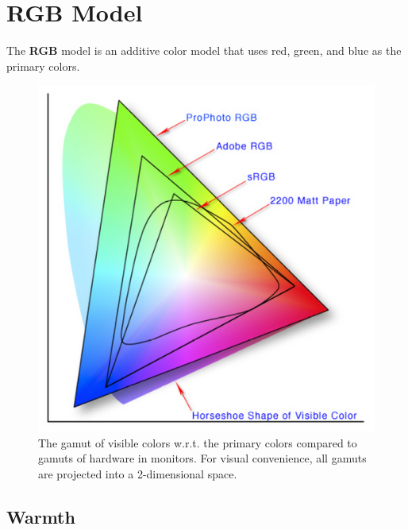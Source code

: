\section{RGB Model} 

  \begin{definition}[RGB]
    The \textbf{RGB} model is an additive color model that uses red, green, and blue as the primary colors. 
  \end{definition}

  \begin{figure}[H]
    \centering 
    \includegraphics[scale=0.4]{img/colorspace.png}
    \caption{The gamut of visible colors w.r.t. the primary colors compared to gamuts of hardware in monitors. For visual convenience, all gamuts are projected into a 2-dimensional space.} 
    \label{fig:colorspace}
  \end{figure}

\subsection{Warmth}
